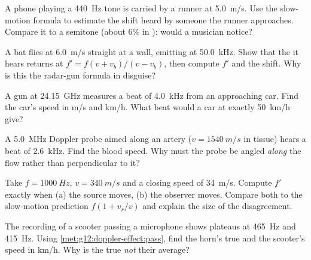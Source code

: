 \begin{exercise}[$\star$]\label{exo:g12:doppler-effect:5}
A phone playing a \qty{440}{Hz} tone is carried by a runner at \qty{5.0}{m/s}. Use the
slow-motion formula to estimate the shift heard by someone the runner approaches. Compare
it to a semitone (about $6\%$ in ): would a musician notice?
\end{exercise}

\begin{exercise}[$\star\star$]\label{exo:g12:doppler-effect:6}
A bat flies at \qty{6.0}{m/s} straight at a wall, emitting at \qty{50.0}{kHz}. Show that
the  it hears returns at $f' = f(v + v_b)/(v - v_b)$, then compute $f'$ and the shift.
Why is this the radar-gun formula in disguise?
\end{exercise}

\begin{exercise}[$\star\star$]\label{exo:g12:doppler-effect:7}
A  gun at \qty{24.15}{GHz} measures a beat of \qty{4.0}{kHz} from an approaching car.
Find the car's speed in \unit{m/s} and \unit{km/h}. What beat would a car at exactly
\qty{50}{km/h} give?
\end{exercise}

\begin{exercise}[$\star\star$]\label{exo:g12:doppler-effect:8}
A \qty{5.0}{MHz} Doppler  probe aimed along an artery ($v = \qty{1540}{m/s}$ in
tissue) hears a beat of \qty{2.6}{kHz}. Find the blood speed. Why must the probe be angled
\emph{along} the flow rather than perpendicular to it?
\end{exercise}

\begin{exercise}[$\star\star$]\label{exo:g12:doppler-effect:9}
Take $f = \qty{1000}{Hz}$, $v = \qty{340}{m/s}$ and a closing speed of \qty{34}{m/s}.
Compute $f'$ exactly when (a) the source moves, (b) the observer moves. Compare both to
the slow-motion prediction $f(1 + v_r/v)$ and explain the size of the disagreement.
\end{exercise}

\begin{exercise}[$\star\star$]\label{exo:g12:doppler-effect:10}
The recording of a scooter passing a microphone shows plateaus at \qty{465}{Hz} and
\qty{415}{Hz}. Using \cref{met:g12:doppler-effect:pass}, find the horn's true  and
the scooter's speed in \unit{km/h}. Why is the true  \emph{not} their average?
\end{exercise}

